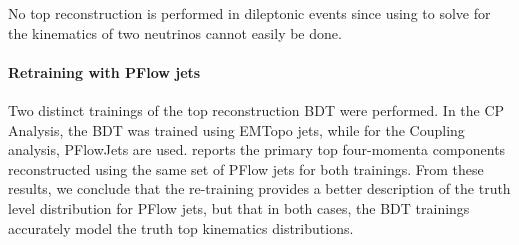 No top reconstruction is performed in dileptonic events since using \MET to solve for the kinematics of two neutrinos cannot easily be done.

\paragraph{Retraining with PFlow jets}
Two distinct trainings of the top reconstruction BDT were performed. In the CP Analysis, the BDT was trained using EMTopo jets, while for the Coupling analysis, PFlowJets are used. \Fig{\ref{fig:sel_topReco_retrain}} reports the primary top four-momenta components reconstructed using the same set of PFlow jets for both trainings. From these results, we conclude that the re-training provides a better description of the truth level distribution for PFlow jets, but that in both cases, the BDT trainings accurately model the truth top kinematics distributions.

